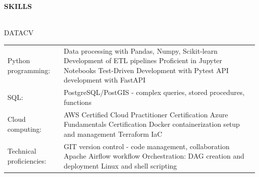 \documentclass[letterpaper]{article}
\newcommand{\lineunder} {
        \vspace*{-8pt} \\
        \hspace*{-18pt} \hrulefill \\
    }
\newcommand{\header} [1] {
        \vspace{9pt}
        {\hspace*{-18pt}\vspace*{6pt} \large \textbf {#1}}
        \vspace*{-6pt} \lineunder
        \vspace{2pt}
    }
\newenvironment{skillslist}
        {
            \hspace*{-0.07in}\begin{tabular}[t]{ l L{5.17in} }
        }{
            \end{tabular}
        }
\begin{document}
\header{SKILLS}
    \begin{taggedblock}{DATACV}
        \begin{skillslist}
            Python programming:&
                Data processing with Pandas, Numpy, Scikit-learn \linebreak
                Development of ETL pipelines \linebreak
                Proficient in Jupyter Notebooks \linebreak
                Test-Driven Development with Pytest \linebreak
                API development with FastAPI \linebreak
                \\
            SQL:&
                PostgreSQL/PostGIS - complex queries, stored procedures, functions \linebreak
                \\
            Cloud computing:&
                AWS Certified Cloud Practitioner Certification \linebreak
                Azure Fundamentals Certification \linebreak
                Docker containerization setup and management \linebreak
                Terraform IaC \linebreak
                \\
            Technical proficiencies:&
                GIT version control - code management, collaboration \linebreak
                Apache Airflow workflow Orchestration: DAG creation and deployment \linebreak
                Linux and shell scripting \linebreak
                \\
        \end{skillslist}
    \end{taggedblock}
\end{document}
